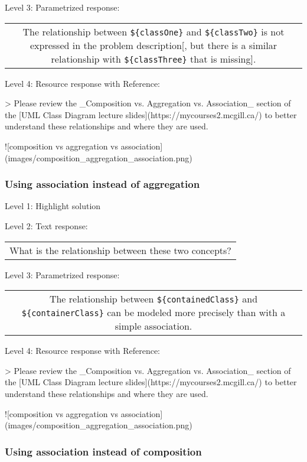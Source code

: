 \noindent Level 3: Parametrized response: \medskip

\begin{tabular}{|c}
The relationship between \verb|${classOne}| and \verb|${classTwo}| is not expressed in the problem description[, but there is a similar relationship with \verb|${classThree}| that is missing].
\end{tabular} \medskip

\noindent Level 4: Resource response with Reference:

> Please review the _Composition vs. Aggregation vs. Association_ section of 
the [UML Class Diagram lecture slides](https://mycourses2.mcgill.ca/) to 
better understand these relationships and where they are used.

![composition vs aggregation vs association](images/composition_aggregation_association.png)


\subsubsection{Using association instead of aggregation}

\noindent Level 1: Highlight solution \medskip

\noindent Level 2: Text response: \medskip

\begin{tabular}{|c}
What is the relationship between these two concepts?
\end{tabular} \medskip

\noindent Level 3: Parametrized response: \medskip

\begin{tabular}{|c}
The relationship between \verb|${containedClass}| and \verb|${containerClass}| can be modeled more precisely than with a simple association.
\end{tabular} \medskip

\noindent Level 4: Resource response with Reference:

> Please review the _Composition vs. Aggregation vs. Association_ section of 
the [UML Class Diagram lecture slides](https://mycourses2.mcgill.ca/) to 
better understand these relationships and where they are used.

![composition vs aggregation vs association](images/composition_aggregation_association.png)


\subsubsection{Using association instead of composition}

